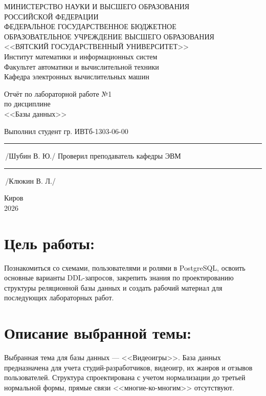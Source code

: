 \documentclass[oneside,a4paper,14pt]{extarticle}
\begin{document}
	
	\newpage\thispagestyle{empty}
	\begin{center}
		МИНИСТЕРСТВО НАУКИ И ВЫСШЕГО ОБРАЗОВАНИЯ\\
		РОССИЙСКОЙ ФЕДЕРАЦИИ\\
		ФЕДЕРАЛЬНОЕ ГОСУДАРСТВЕННОЕ БЮДЖЕТНОЕ\\
		ОБРАЗОВАТЕЛЬНОЕ УЧРЕЖДЕНИЕ ВЫСШЕГО ОБРАЗОВАНИЯ\\
		<<ВЯТСКИЙ ГОСУДАРСТВЕННЫЙ УНИВЕРСИТЕТ>>\\
		Институт математики и информационных систем\\
		Факультет автоматики и вычислительной техники\\
		Кафедра электронных вычислительных машин
	\end{center}
	\vspace{20mm}
	\begin{center}
		Отчёт по лабораторной работе №1\\
		по дисциплине\\
		<<Базы данных>>\\
	\end{center}
	\vspace{48mm}
	\noindent
	Выполнил студент гр. ИВТб-1303-06-00 \hfill \rule[-0,5mm]{30mm}{0.15mm}\,/Шубин В. Ю./
	\newline
	Проверил преподаватель кафедры ЭВМ \hfill \rule[-0,5mm]{30mm}{0.15mm}\,/Клюкин В. Л./
	\vfill
	\begin{center}
		Киров\\
		2026
	\end{center}
	
	\newpage
	\thispagestyle{empty}
	
	\section*{Цель работы:} Познакомиться со схемами, пользователями и ролями в PostgreSQL, освоить основные варианты DDL-запросов, закрепить знания по проектированию структуры реляционной базы данных и создать рабочий материал для последующих лабораторных работ.
	
	\section*{Описание выбранной темы:} Выбранная тема для базы данных --- <<Видеоигры>>. База данных предназначена для учета студий-разработчиков, видеоигр, их жанров и отзывов пользователей. Структура спроектирована с учетом нормализации до третьей нормальной формы, прямые связи <<многие-ко-многим>> отсутствуют.
	
\end{document}
